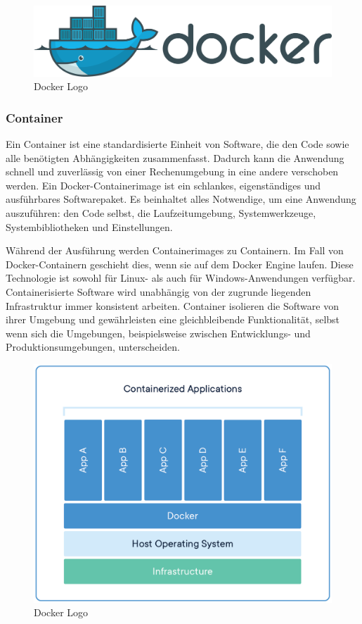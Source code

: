 \begin{figure}[h!]
    \centering
    \includegraphics[width=0.7\linewidth]{pics/docker-logo.png}
    \caption{Docker Logo}
    \label{fig:enter-label}
\end{figure}

\subsubsection{Container}
Ein Container ist eine standardisierte Einheit von Software, die den Code sowie alle benötigten Abhängigkeiten zusammenfasst. Dadurch kann die Anwendung schnell und zuverlässig von einer Rechenumgebung in eine andere verschoben werden. Ein Docker-Containerimage ist ein schlankes, eigenständiges und ausführbares Softwarepaket. Es beinhaltet alles Notwendige, um eine Anwendung auszuführen: den Code selbst, die Laufzeitumgebung, Systemwerkzeuge, Systembibliotheken und Einstellungen.\newline

Während der Ausführung werden Containerimages zu Containern. Im Fall von Docker-Containern geschieht dies, wenn sie auf dem Docker Engine laufen. Diese Technologie ist sowohl für Linux- als auch für Windows-Anwendungen verfügbar. Containerisierte Software wird unabhängig von der zugrunde liegenden Infrastruktur immer konsistent arbeiten. Container isolieren die Software von ihrer Umgebung und gewährleisten eine gleichbleibende Funktionalität, selbst wenn sich die Umgebungen, beispielsweise zwischen Entwicklungs- und Produktionsumgebungen, unterscheiden.

\begin{figure}[h!]
    \centering
    \includegraphics[width=0.7\linewidth]{pics/docker-container.png}
    \caption{Docker Logo}
    \label{fig:enter-label}
\end{figure}

\cite{Vorteile_Nachteile_Docker}
\cite{Was_ist_Docker}




